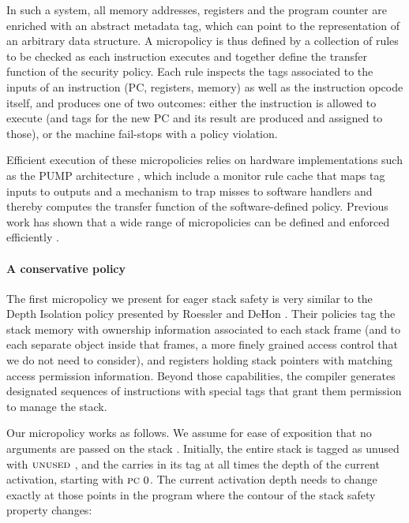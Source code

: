 \documentclass[acmsmall,review,anonymous]{acmart}\settopmatter{printfolios=true,printccs=false,printacmref=false}
\begin{document}
In such a system, all memory addresses, registers and the program counter are
enriched with an abstract metadata tag, which can point to the representation of
an arbitrary data structure. A micropolicy is thus defined by a collection of
rules to be checked as each instruction executes and together define the
transfer function of the security policy. Each rule inspects the tags associated
to the inputs of an instruction (PC, registers, memory) as well as the
instruction opcode itself, and produces one of two outcomes: either the
instruction is allowed to execute (and tags for the new PC and its result are
produced and assigned to those), or the machine fail-stops with a policy
violation.

Efficient execution of these micropolicies relies on hardware implementations
such as the PUMP architecture , which include a monitor rule cache that
maps tag inputs to outputs and a mechanism to trap misses to software handlers
and thereby computes the transfer function of the software-defined policy.
Previous work has shown that a wide range of micropolicies can be defined and
enforced efficiently .
%

\paragraph*{A conservative policy}
%
The first micropolicy we present for eager stack safety is very similar to the
Depth Isolation policy presented by Roessler and DeHon . Their policies
tag the stack memory with ownership information associated to each stack frame
(and to each separate object inside that frames, a more finely grained access
control that we do not need to consider), and registers holding stack pointers
with matching access permission information. Beyond those capabilities, the
compiler generates designated sequences of instructions with special tags that
grant them permission to manage the stack.

Our micropolicy works as follows. We assume for ease of exposition that no
arguments are passed on the stack . Initially, the
entire stack is tagged as unused with $\textsc{unused}$ , and the {\PCname} carries in
its tag at all times the depth of the current activation, starting with
$\textsc{pc} ~ 0$. The current activation depth needs to change exactly at those
points in the program where the contour of the stack safety property changes:
\end{document}
